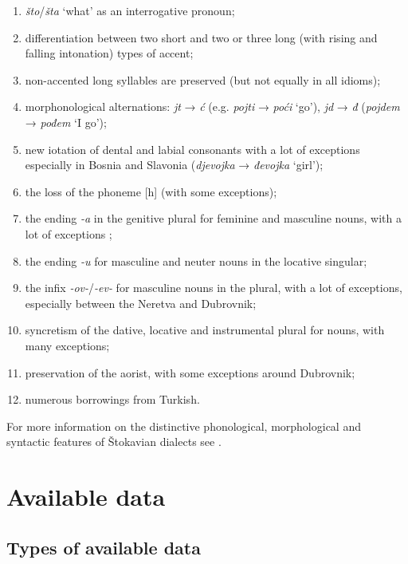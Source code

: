 \begin{enumerate}
\item \textit{što}/\textit{šta} ‘what’ as an interrogative pronoun;
\item differentiation between two short and two or three long (with rising and falling intonation) types of accent;
\item non-accented long syllables are preserved (but not equally in all idioms);
\item morphonological alternations: \textit{jt} → \textit{ć} (e.g. \textit{pojti} → \textit{poći} ‘go’), \textit{jd} → \textit{đ} (\textit{pojdem} → \textit{pođem} ‘I go’);
\item new iotation of dental and labial consonants with a lot of exceptions especially in Bosnia and Slavonia (\textit{djevojka} → \textit{đevojka} ‘girl’);
\item the loss of the phoneme [h] (with some exceptions);
\item the ending \textit{-a} in the genitive plural for feminine and masculine nouns, with a lot of exceptions ;
\item the ending \textit{-u} for masculine and neuter nouns in the locative singular;
\item the infix \textit{-ov-}\slash\textit{-ev-} for masculine nouns in the plural, with a lot of exceptions, especially between the Neretva and Dubrovnik;
\item syncretism of the dative, locative and instrumental plural for nouns, with many exceptions;
\item preservation of the aorist, with some exceptions around Dubrovnik;
\item numerous borrowings from Turkish.
\end{enumerate}

For more information on the distinctive phonological, morphological and syntactic features of Štokavian dialects see \citet[19--26]{Lisac03}. 

\section{Available data}
\label{Available data}
\subsection{Types of available data}

